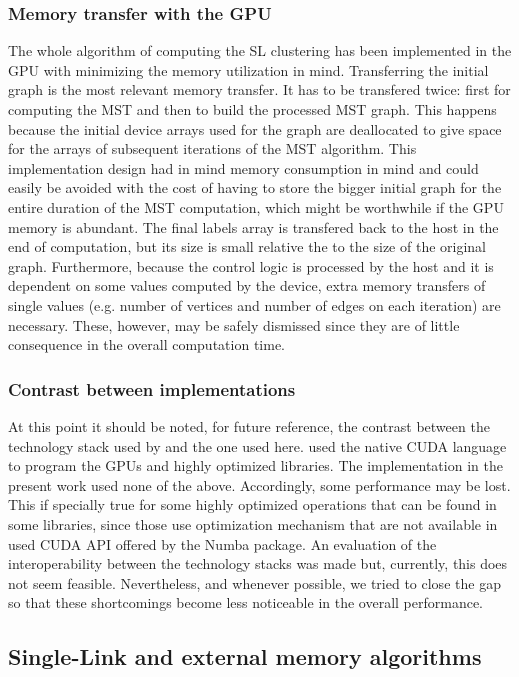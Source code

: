 \subsubsection{Memory transfer with the GPU}
The whole algorithm of computing the SL clustering has been implemented in the GPU with minimizing the memory utilization in mind.
Transferring the initial graph is the most relevant memory transfer.
It has to be transfered twice: first for computing the MST and then to build the processed MST graph.
This happens because the initial device arrays used for the graph are deallocated to give space for the arrays of subsequent iterations of the MST algorithm.
This implementation design had in mind memory consumption in mind and could easily be avoided with the cost of having to store the bigger initial graph for the entire duration of the MST computation, which might be worthwhile if the GPU memory is abundant.
The final labels array is transfered back to the host in the end of computation, but its size is small relative the to the size of the original graph.
Furthermore, because the control logic is processed by the host and it is dependent on some values computed by the device, extra memory transfers of single values (e.g. number of vertices and number of edges on each iteration) are necessary.
These, however, may be safely dismissed since they are of little consequence in the overall computation time.


\subsubsection{Contrast between implementations}

At this point it should be noted, for future reference, the contrast between the technology stack used by \citet{Sousa2015} and the one used here.
\citet{Sousa2015} used the native CUDA language to program the GPUs and highly optimized libraries.
The implementation in the present work used none of the above.
Accordingly, some performance may be lost.
This if specially true for some highly optimized operations that can be found in some libraries, since those use optimization mechanism that are not available in used CUDA API offered by the Numba package.
An evaluation of the interoperability between the technology stacks was made but, currently, this does not seem feasible.
Nevertheless, and whenever possible, we tried to close the gap so that these shortcomings become less noticeable in the overall performance.

\subsection{Single-Link and external memory algorithms}
\label{sec:sl disk}


